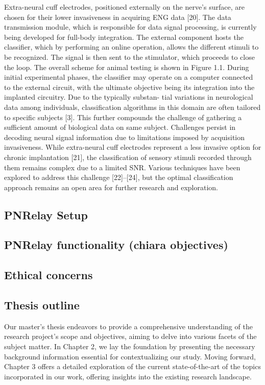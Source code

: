 \documentclass{Configuration_Files/PoliMi3i_thesis}
\begin{document}
Extra-neural cuff electrodes, positioned externally on the nerve’s surface, are chosen for their lower invasiveness in acquiring ENG data [20]. The data transmission module, which is responsible for data signal processing, is currently being developed for full-body integration. The external component hosts the classifier, which by performing an online operation, allows the different stimuli to be recognized. The signal is then sent to the stimulator, which proceeds to close the loop. The overall scheme for animal testing is shown in Figure 1.1. During initial experimental phases, the classifier may operate on a computer connected to the external circuit, with the ultimate objective being its integration into the implanted circuitry. Due to the typically substan- tial variations in neurological data among individuals, classification algorithms in this domain are often tailored to specific subjects [3]. This further compounds the challenge of gathering a sufficient amount of biological data on same subject. Challenges persist in decoding neural signal information due to limitations imposed by acquisition invasiveness. While extra-neural cuff electrodes represent a less invasive option for chronic implantation [21], the classification of sensory stimuli recorded through them remains complex due to a limited SNR. Various techniques have been explored to address this challenge [22]–[24], but the optimal classification approach remains an open area for further research and exploration.
\\
\subsection{PNRelay Setup}

\subsection{PNRelay functionality (chiara objectives)}



\subsection{Ethical concerns}

\subsection{Thesis outline}


Our master's thesis endeavors to provide a comprehensive understanding of the research project's scope and objectives, aiming to delve into various facets of the subject matter. In Chapter 2, we lay the foundation by presenting the necessary background information essential for contextualizing our study. Moving forward, Chapter 3 offers a detailed exploration of the current state-of-the-art of the topics incorporated in our work, offering insights into the existing research landscape.
\end{document}
